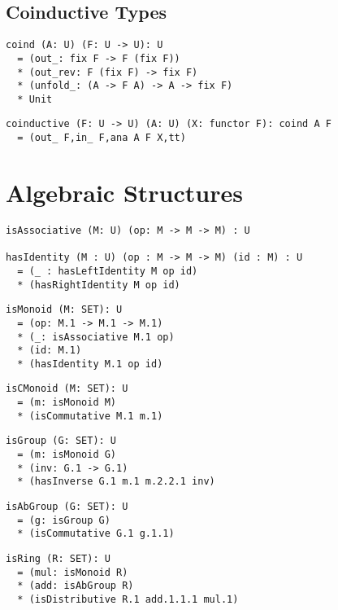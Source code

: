 \documentclass{article}
\begin{document}
\subsection{Coinductive Types}

\begin{lstlisting}[mathescape=true]
coind (A: U) (F: U -> U): U
  = (out_: fix F -> F (fix F))
  * (out_rev: F (fix F) -> fix F)
  * (unfold_: (A -> F A) -> A -> fix F)
  * Unit
\end{lstlisting}

\begin{lstlisting}[mathescape=true]
coinductive (F: U -> U) (A: U) (X: functor F): coind A F
  = (out_ F,in_ F,ana A F X,tt)
\end{lstlisting}

\newpage
\section{Algebraic Structures}

\begin{lstlisting}[mathescape=true]
isAssociative (M: U) (op: M -> M -> M) : U

hasIdentity (M : U) (op : M -> M -> M) (id : M) : U
  = (_ : hasLeftIdentity M op id)
  * (hasRightIdentity M op id)
\end{lstlisting}

\begin{lstlisting}[mathescape=true]
isMonoid (M: SET): U
  = (op: M.1 -> M.1 -> M.1)
  * (_: isAssociative M.1 op)
  * (id: M.1)
  * (hasIdentity M.1 op id)
\end{lstlisting}

\begin{lstlisting}[mathescape=true]
isCMonoid (M: SET): U
  = (m: isMonoid M)
  * (isCommutative M.1 m.1)
\end{lstlisting}

\begin{lstlisting}[mathescape=true]
isGroup (G: SET): U
  = (m: isMonoid G)
  * (inv: G.1 -> G.1)
  * (hasInverse G.1 m.1 m.2.2.1 inv)
\end{lstlisting}

\begin{lstlisting}[mathescape=true]
isAbGroup (G: SET): U
  = (g: isGroup G)
  * (isCommutative G.1 g.1.1)
\end{lstlisting}

\begin{lstlisting}[mathescape=true]
isRing (R: SET): U
  = (mul: isMonoid R)
  * (add: isAbGroup R)
  * (isDistributive R.1 add.1.1.1 mul.1)
\end{lstlisting}
\end{document}

